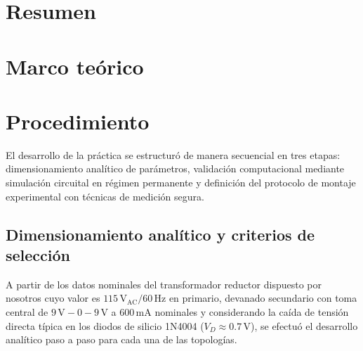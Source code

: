 \section{Resumen}
\section{Marco teórico}
\section{Procedimiento}

El desarrollo de la práctica se estructuró de manera secuencial en tres etapas: dimensionamiento analítico de parámetros, validación computacional mediante simulación circuital en régimen permanente y definición del protocolo de montaje experimental con técnicas de medición segura.

\subsection{Dimensionamiento analítico y criterios de selección}

A partir de los datos nominales del transformador reductor dispuesto por nosotros cuyo valor es $115\,\mathrm{V_{AC}} / 60\,\mathrm{Hz}$ en primario, devanado secundario con toma central de $9\,\mathrm{V} - 0 - 9\,\mathrm{V}$ a $600\,\mathrm{mA}$ nominales y considerando la caída de tensión directa típica en los diodos de silicio 1N4004 ($V_D \approx 0.7\,\mathrm{V}$), se efectuó el desarrollo analítico paso a paso para cada una de las topologías.

